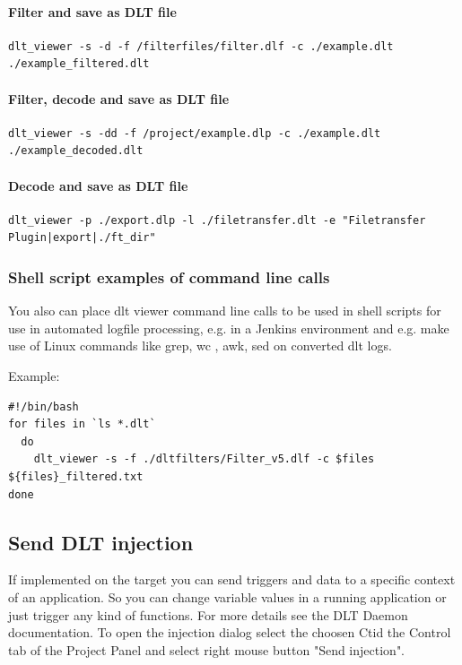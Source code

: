 \documentclass[a4paper,11pt]{article}
\begin{document}
\paragraph{Filter and save as DLT file}
\begin{verbatim}
dlt_viewer -s -d -f /filterfiles/filter.dlf -c ./example.dlt ./example_filtered.dlt
\end{verbatim}

\paragraph{Filter, decode and save as DLT file}
\begin{verbatim}
dlt_viewer -s -dd -f /project/example.dlp -c ./example.dlt ./example_decoded.dlt
\end{verbatim}

\paragraph{Decode and save as DLT file}
\begin{verbatim}
dlt_viewer -p ./export.dlp -l ./filetransfer.dlt -e "Filetransfer Plugin|export|./ft_dir"
\end{verbatim}

\subsubsection{Shell script examples of command line calls}

You also can place dlt viewer command line calls to be used in shell scripts for use
in automated logfile processing, e.g. in a Jenkins environment 
and e.g. make use of Linux commands like grep, wc , awk, sed on converted dlt logs.

Example:
\begin{verbatim}
#!/bin/bash
for files in `ls *.dlt`
  do
    dlt_viewer -s -f ./dltfilters/Filter_v5.dlf -c $files ${files}_filtered.txt
done
\end{verbatim}

\pagebreak

\subsection{Send DLT injection}
If implemented on the target you can send triggers and data to a specific context of an application.
So you can change variable values in a running application or just trigger any kind of functions.
For more details see the DLT Daemon documentation.\linebreak
To open the injection dialog select the choosen Ctid the Control tab of the Project Panel and
select right mouse button "Send injection".
\end{document}
